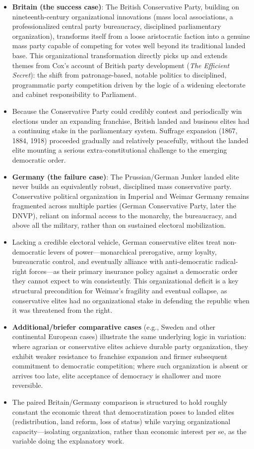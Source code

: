 \documentclass[12pt]{article}
\begin{document}
\begin{itemize}[leftmargin=*, itemsep=4pt]
    \item \textbf{Britain (the success case)}: The British Conservative Party, building on nineteenth-century organizational innovations (mass local associations, a professionalized central party bureaucracy, disciplined parliamentary organization), transforms itself from a loose aristocratic faction into a genuine mass party capable of competing for votes well beyond its traditional landed base. This organizational transformation directly picks up and extends themes from Cox's account of British party development (\textit{The Efficient Secret}): the shift from patronage-based, notable politics to disciplined, programmatic party competition driven by the logic of a widening electorate and cabinet responsibility to Parliament.
    \item Because the Conservative Party could credibly contest and periodically win elections under an expanding franchise, British landed and business elites had a continuing stake in the parliamentary system. Suffrage expansion (1867, 1884, 1918) proceeded gradually and relatively peacefully, without the landed elite mounting a serious extra-constitutional challenge to the emerging democratic order.
    \item \textbf{Germany (the failure case)}: The Prussian/German Junker landed elite never builds an equivalently robust, disciplined mass conservative party. Conservative political organization in Imperial and Weimar Germany remains fragmented across multiple parties (German Conservative Party, later the DNVP), reliant on informal access to the monarchy, the bureaucracy, and above all the military, rather than on sustained electoral mobilization.
    \item Lacking a credible electoral vehicle, German conservative elites treat non-democratic levers of power---monarchical prerogative, army loyalty, bureaucratic control, and eventually alliance with anti-democratic radical-right forces---as their primary insurance policy against a democratic order they cannot expect to win consistently. This organizational deficit is a key structural precondition for Weimar's fragility and eventual collapse, as conservative elites had no organizational stake in defending the republic when it was threatened from the right.
    \item \textbf{Additional/briefer comparative cases} (e.g., Sweden and other continental European cases) illustrate the same underlying logic in variation: where agrarian or conservative elites achieve durable party organization, they exhibit weaker resistance to franchise expansion and firmer subsequent commitment to democratic competition; where such organization is absent or arrives too late, elite acceptance of democracy is shallower and more reversible.
    \item The paired Britain/Germany comparison is structured to hold roughly constant the economic threat that democratization poses to landed elites (redistribution, land reform, loss of status) while varying organizational capacity---isolating organization, rather than economic interest per se, as the variable doing the explanatory work.
\end{itemize}
\end{document}
